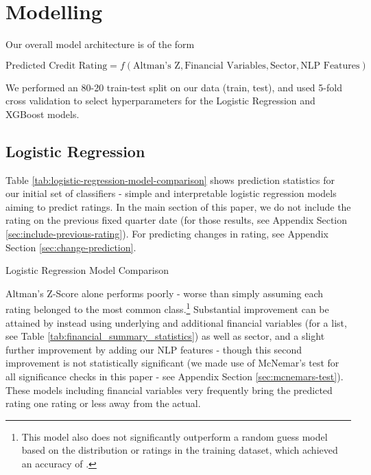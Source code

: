 \documentclass{article}[11pt]
\begin{document}
    \section*{Modelling}

    Our overall model architecture is of the form

    \begin{equation*}
        \text{Predicted Credit Rating} = f(\text{Altman's Z}, \text{Financial Variables}, \text{Sector}, \text{NLP Features})
    \end{equation*}

    We performed an 80-20 train-test split on our data (\trainCount \space train, \testCount \space test), and used 5-fold cross validation to select hyperparameters for the Logistic Regression and XGBoost models.

    \subsection*{Logistic Regression}

    Table \ref{tab:logistic-regression-model-comparison} shows prediction statistics for our initial set of classifiers - simple and interpretable logistic regression models aiming to predict ratings. In the main section of this paper, we do not include the rating on the previous fixed quarter date (for those results, see Appendix Section \ref{sec:include-previous-rating}). For predicting changes in rating, see Appendix Section \ref{sec:change-prediction}.
    
    \begin{table}[h!]
        \centering
        \caption{Logistic Regression Model Comparison}
        
        \label{tab:logistic-regression-model-comparison}
    \end{table}

    Altman's Z-Score alone performs poorly - worse than simply assuming each rating belonged to the most common class.\footnote{This model also does not significantly outperform a random guess model based on the distribution or ratings in the training dataset, which achieved an accuracy of \ratingRGAcc.} Substantial improvement can be attained by instead using underlying and additional financial variables (for a list, see Table \ref{tab:financial_summary_statistics}) as well as sector, and a slight further improvement by adding our NLP features - though this second improvement is not statistically significant (we made use of McNemar's test for all significance checks in this paper - see Appendix Section \ref{sec:mcnemars-test}). These models including financial variables very frequently bring the predicted rating one rating or less away from the actual.
\end{document}
